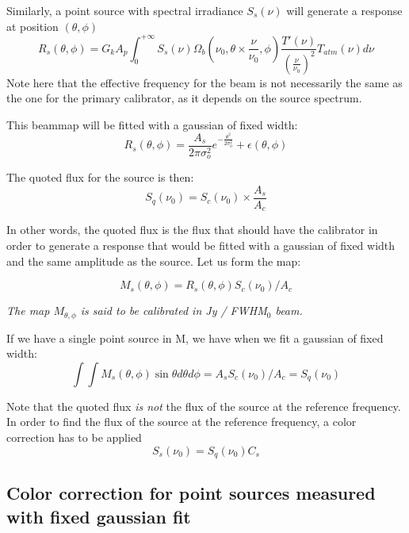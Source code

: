 Similarly, a point source with spectral irradiance $S_{s}(\nu)$ will
generate a response at position $(\theta, \phi)$
\begin{equation}
R_{s}(\theta, \phi) =  G_{k} A_{p}  \int_{0}^{+\infty}
S_{s}(\nu) \Omega_{b}(\nu_{0}, \theta \times \frac{\nu}{\nu_{0}},
\phi) \frac{T'(\nu)}{\left(\frac{\nu}{\nu_{0}}\right)^{2}}
T_{atm}(\nu) d\nu
\end{equation}
Note here that the effective frequency for the beam is not necessarily
the same as the one for the primary calibrator, as it depends on the
source spectrum.


This beammap will be fitted with a gaussian of fixed width:
\begin{equation} 
R_{s}(\theta, \phi)  = \frac{A_{s}}{2 \pi \sigma_{o}^{2}}
e^{-\frac{\theta^{2}}{2\sigma_{0}^{2}}}  + \epsilon(\theta, \phi)
\end{equation}

The quoted flux for the source is then:
\begin{equation}
S_{q}(\nu_{0}) =  S_{c} (\nu_{0})  \times \frac{A_{s}}{A_{c}}
\end{equation}

In other words, the quoted flux is the flux that should have the
calibrator in order to generate a response that would be fitted with a
gaussian of fixed width and the same amplitude as the source.
Let us form the map:

\begin{equation}
M_{s}(\theta, \phi) = R_{s}(\theta, \phi)   S_{c} (\nu_{0}) / A_{c}
\end{equation}

 {\em The map $M_{\theta, \phi}$ is said to be calibrated in Jy / FWHM$_{0}$ beam.}

If we have a single point source in M, we have when we fit a gaussian
of fixed width:
\begin{equation}
\int \int M_{s}(\theta, \phi) \sin \theta d\theta d\phi = A_{s}  S_{c} (\nu_{0}) /
A_{c} = S_{q}(\nu_{0})
\end{equation}


Note that the quoted flux {\em is not} the flux of the source at the
reference frequency. In order to find the flux of the source at the
reference frequency, a color correction has to be applied
\begin{equation}
S_{s}(\nu_{0}) = S_{q}(\nu_{0})  C_{s}
\end{equation}

\subsection{Color correction for point sources measured with fixed
  gaussian fit}


